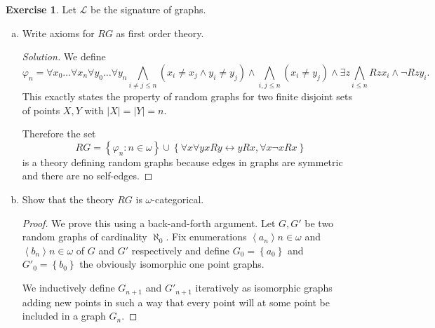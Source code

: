 \documentclass{article}
\renewcommand{\qedsymbol}{\raisebox{-0.5cm}{}}
\newcommand{\gen}[1]{\left<#1\right>}
\newcommand{\set}[1]{\left\{#1\right\}}
\newcommand{\setwith}[2]{\left\{#1:#2\right\}}
\newcommand{\lang}{\mathscr{L}}
\newenvironment{solution}{\begin{proof}[Solution]\renewcommand\qedsymbol{}}{\end{proof}}
\theoremstyle{definition}
\newtheorem{question}{Exercise}
\begin{document}
\begin{question}
    Let \(\lang\) be the signature of graphs.

    \begin{enumerate}[(a)]
        \item Write axioms for \(RG\) as first order theory.

              \begin{solution}
                  We define
                  \[
                      \varphi_{n}=\forall x_{0}\ldots\forall x_{n}\forall y_{0}\ldots\forall y_{n}
                      \bigwedge_{i\neq j\leq n}(x_{i}\neq x_{j}\wedge y_{i}\neq y_{j})
                      \wedge\bigwedge_{i,j\leq n}(x_{i}\neq y_{j})
                      \wedge\exists z\bigwedge_{i\leq n}Rzx_{i}\wedge\neg Rzy_{i}.
                  \]
                  This exactly states the property of random graphs for two
                  finite disjoint sets of points \(X,Y\) with
                  \(\left|X\right|=\left|Y\right|=n\).

                  Therefore the set
                  \[
                      RG=\setwith{\varphi_{n}}{n\in\omega}\cup\set{\forall x\forall y xRy\leftrightarrow yRx,\forall x\neg xRx}
                  \]
                  is a theory defining random graphs because edges in graphs are
                  symmetric and there are no self-edges.
              \end{solution}

        \item Show that the theory \(RG\) is \(\omega\)-categorical.

              \begin{proof}
                  We prove this using a back-and-forth argument. Let \(G,G'\) be
                  two random graphs of cardinality \(\aleph_{0}\). Fix
                  enumerations \(\gen{a_{n}}{n\in\omega}\) and
                  \(\gen{b_{n}}{n\in\omega}\) of \(G\) and \(G'\) respectively
                  and define \(G_{0}=\set{a_{0}}\) and \(G'_{0}=\set{b_{0}}\)
                  the obviously isomorphic one point graphs.

                  We inductively define \(G_{n+1}\) and \(G'_{n+1}\) iteratively
                  as isomorphic graphs adding new points in such a way that
                  every point will at some point be included in a graph
                  \(G_{n}\).


\end{proof}
\end{enumerate}
\end{question}
\end{document}
